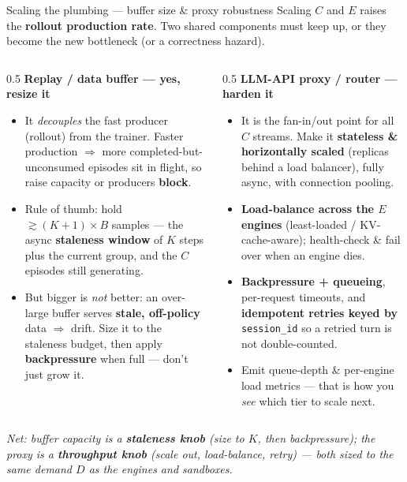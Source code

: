 \documentclass[aspectratio=169]{beamer}
\begin{document}
\begin{frame}{Scaling the plumbing --- buffer size \& proxy robustness}
  \footnotesize Scaling $C$ and $E$ raises the \textbf{rollout production rate}. Two shared components must keep up,
  or they become the new bottleneck (or a correctness hazard).
  \begin{columns}[T]
  \begin{column}{0.5\textwidth}
    \textbf{Replay / data buffer --- yes, resize it}
    \begin{itemize}\footnotesize
      \item It \emph{decouples} the fast producer (rollout) from the trainer. Faster production $\Rightarrow$ more
        completed-but-unconsumed episodes sit in flight, so raise capacity or producers \textbf{block}.
      \item Rule of thumb: hold $\gtrsim (K{+}1)\times B$ samples --- the async \textbf{staleness window} of $K$ steps
        plus the current group, and the $C$ episodes still generating.
      \item But bigger is \emph{not} better: an over-large buffer serves \textbf{stale, off-policy} data $\Rightarrow$ drift.
        Size it to the staleness budget, then apply \textbf{backpressure} when full --- don't just grow it.
    \end{itemize}
  \end{column}
  \begin{column}{0.5\textwidth}
    \textbf{LLM-API proxy / router --- harden it}
    \begin{itemize}\footnotesize
      \item It is the fan-in/out point for all $C$ streams. Make it \textbf{stateless \& horizontally scaled}
        (replicas behind a load balancer), fully async, with connection pooling.
      \item \textbf{Load-balance across the $E$ engines} (least-loaded / KV-cache-aware); health-check \& fail over
        when an engine dies.
      \item \textbf{Backpressure + queueing}, per-request timeouts, and \textbf{idempotent retries keyed by}
        \texttt{session\_id} so a retried turn is not double-counted.
      \item Emit queue-depth \& per-engine load metrics --- that is how you \emph{see} which tier to scale next.
    \end{itemize}
  \end{column}
  \end{columns}
  \vspace{0.2em}
  {\footnotesize\itshape Net: buffer capacity is a \textbf{staleness knob} (size to $K$, then backpressure); the proxy is a
  \textbf{throughput knob} (scale out, load-balance, retry) --- both sized to the same demand $D$ as the engines and sandboxes.}
\end{frame}
\end{document}
